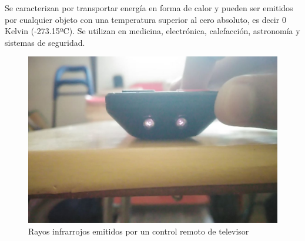 Se caracterizan por transportar energía en forma de calor y pueden ser emitidos por cualquier objeto con una temperatura superior al cero absoluto, es decir 0 Kelvin (-273.15ºC). Se utilizan en medicina, electrónica, calefacción, astronomía y sistemas de seguridad.

\begin{figure}[H]
  \centering
  \includegraphics[scale=0.2]{imagenes/control_remoto.png}
  \caption{Rayos infrarrojos emitidos por un control remoto de televisor}
\end{figure}
